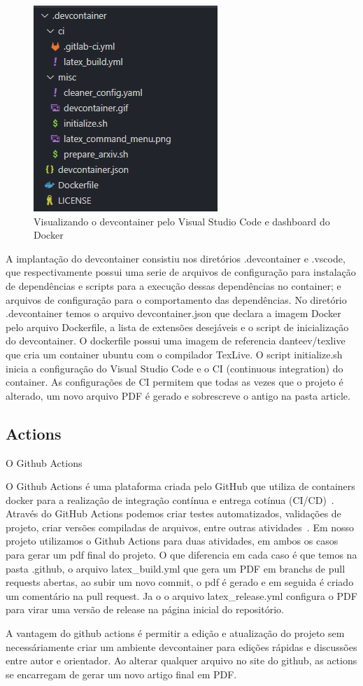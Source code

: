 \begin{figure}[ht]
	\centering
	\includegraphics[width=.5\textwidth]{./images/image12.png}
	\caption{Visualizando o devcontainer pelo Visual Studio Code e dashboard do Docker}
	\label{fig:image12}
\end{figure}
A implantação do devcontainer consistiu nos diretórios .devcontainer e .vscode, que respectivamente possui uma serie de arquivos de configuração para instalação de dependências e scripts para a execução dessas dependências no container; e arquivos de configuração para o comportamento das dependências.
No diretório .devcontainer temos o arquivo devcontainer.json que declara a imagem Docker pelo arquivo Dockerfile, a lista de extensões desejáveis e o script de inicialização do devcontainer. O dockerfile possui uma imagem de referencia  danteev/texlive que cria um container ubuntu com o compilador TexLive. O script initialize.sh inicia a configuração do Visual Studio Code e o CI (continuous integration) do container. As configurações de CI permitem que todas as vezes que o projeto é alterado, um novo arquivo PDF é gerado e sobrescreve o antigo na pasta article.

\subsection{Actions}
O Github Actions 

O Github Actions é uma plataforma criada pelo GitHub que utiliza de containers docker para a realização de integração contínua e entrega cotínua (CI/CD)~\cite{github:02}. Através do GitHub Actions podemos criar testes automatizados, validações de projeto, criar versões compiladas de arquivos, entre outras atividades~\cite{github:02}.
Em nosso projeto utilizamos o Github Actions para duas atividades, em ambos os casos para gerar um pdf final do projeto. O que diferencia em cada caso é que temos na pasta .github, o arquivo latex_build.yml que gera um PDF em branchs de pull requests abertas, ao subir um novo commit, o pdf é gerado e em seguida é criado um comentário na pull request. Ja o o arquivo latex_release.yml configura o PDF para virar uma versão de release na página inicial do repositório.

A vantagem do github actions é permitir a edição e atualização do projeto sem necessáriamente criar um ambiente devcontainer para edições rápidas e discussões entre autor e orientador. Ao alterar qualquer arquivo no site do github, as actions se encarregam de gerar um novo artigo final em PDF.